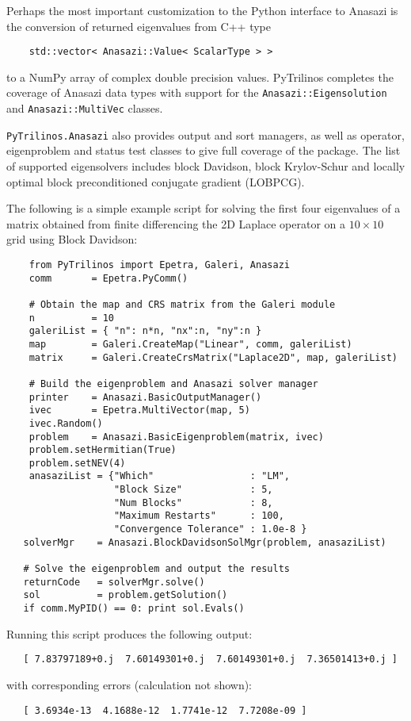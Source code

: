 \documentclass[11pt]{article}
\begin{document}
Perhaps the most important customization to the Python interface to Anasazi is the conversion of returned eigenvalues from C++ type
\begin{verbatim}
    std::vector< Anasazi::Value< ScalarType > >
\end{verbatim}
to a NumPy array of complex double precision values.  PyTrilinos completes the coverage of Anasazi data types with support for the {\tt Anasazi::Eigensolution} and {\tt Anasazi::MultiVec} classes.

{\tt PyTrilinos.Anasazi} also provides output and sort managers, as well as operator, eigenproblem and status test classes to give full coverage of the package.  The list of supported eigensolvers includes block Davidson, block Krylov-Schur and locally optimal block preconditioned conjugate gradient (LOBPCG).

The following is a simple example script for solving the first four eigenvalues of a matrix obtained from finite differencing the 2D Laplace operator on a $10\times10$ grid using Block Davidson:
\begin{verbatim}
    from PyTrilinos import Epetra, Galeri, Anasazi
    comm       = Epetra.PyComm()
    
    # Obtain the map and CRS matrix from the Galeri module
    n          = 10
    galeriList = { "n": n*n, "nx":n, "ny":n }
    map        = Galeri.CreateMap("Linear", comm, galeriList)
    matrix     = Galeri.CreateCrsMatrix("Laplace2D", map, galeriList)
    
    # Build the eigenproblem and Anasazi solver manager
    printer    = Anasazi.BasicOutputManager()
    ivec       = Epetra.MultiVector(map, 5)
    ivec.Random()
    problem    = Anasazi.BasicEigenproblem(matrix, ivec)
    problem.setHermitian(True)
    problem.setNEV(4)
    anasaziList = {"Which"                 : "LM",
                   "Block Size"            : 5,
                   "Num Blocks"            : 8,
                   "Maximum Restarts"      : 100,
                   "Convergence Tolerance" : 1.0e-8 }
   solverMgr    = Anasazi.BlockDavidsonSolMgr(problem, anasaziList)
   
   # Solve the eigenproblem and output the results
   returnCode   = solverMgr.solve()
   sol          = problem.getSolution()
   if comm.MyPID() == 0: print sol.Evals()
\end{verbatim}
Running this script produces the following output:
\begin{verbatim}
   [ 7.83797189+0.j  7.60149301+0.j  7.60149301+0.j  7.36501413+0.j ]
\end{verbatim}
with corresponding errors (calculation not shown):
\begin{verbatim}
   [ 3.6934e-13  4.1688e-12  1.7741e-12  7.7208e-09 ]
\end{verbatim}
\end{document}
